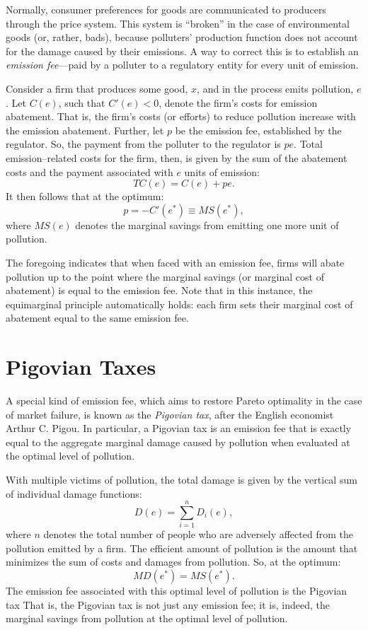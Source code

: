 \documentclass[
]{book}
\begin{document}
Normally, consumer preferences for goods are communicated to producers through the price system. This system is ``broken'' in the case of environmental goods (or, rather, bads), because polluters' production function does not account for the damage caused by their emissions. A way to correct this is to establish an \emph{emission fee}---paid by a polluter to a regulatory entity for every unit of emission.

Consider a firm that produces some good, \(x\), and in the process emits pollution, \(e\). Let \(C(e)\), such that \(C'(e)<0\), denote the firm's costs for emission abatement. That is, the firm's costs (or efforts) to reduce pollution increase with the emission abatement. Further, let \(p\) be the emission fee, established by the regulator. So, the payment from the polluter to the regulator is \(pe\). Total emission--related costs for the firm, then, is given by the sum of the abatement costs and the payment associated with \(e\) units of emission: \[TC(e) = C(e)+pe.\] It then follows that at the optimum: \[p=-C'(e^*) \equiv MS(e^*),\] where \(MS(e)\) denotes the marginal savings from emitting one more unit of pollution.

The foregoing indicates that when faced with an emission fee, firms will abate pollution up to the point where the marginal savings (or marginal cost of abatement) is equal to the emission fee. Note that in this instance, the equimarginal principle automatically holds: each firm sets their marginal cost of abatement equal to the same emission fee.

\hypertarget{pigovian-taxes}{%
\section{Pigovian Taxes}\label{pigovian-taxes}}

A special kind of emission fee, which aims to restore Pareto optimality in the case of market failure, is known as the \emph{Pigovian tax}, after the English economist Arthur C. Pigou. In particular, a Pigovian tax is an emission fee that is exactly equal to the aggregate marginal damage caused by pollution when evaluated at the optimal level of pollution.

With multiple victims of pollution, the total damage is given by the vertical sum of individual damage functions: \[D(e) = \sum_{i=1}^{n}D_i(e),\] where \(n\) denotes the total number of people who are adversely affected from the pollution emitted by a firm. The efficient amount of pollution is the amount that minimizes the sum of costs and damages from pollution. So, at the optimum: \[MD(e^*) = MS(e^*).\] The emission fee associated with this optimal level of pollution is the Pigovian tax That is, the Pigovian tax is not just any emission fee; it is, indeed, the marginal savings from pollution at the optimal level of pollution.
\end{document}
